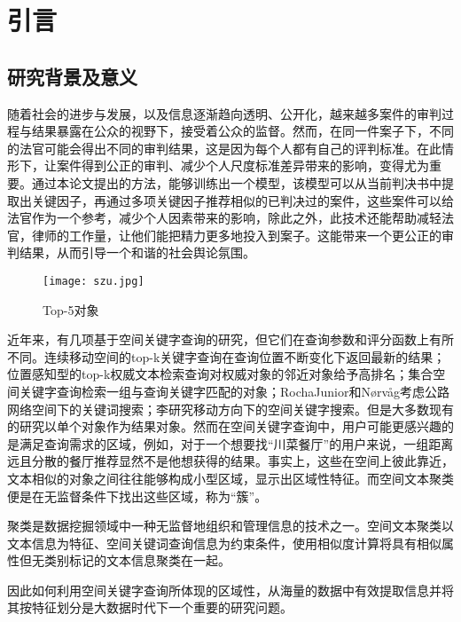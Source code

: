 \section{引言}

\subsection{研究背景及意义}
随着社会的进步与发展，以及信息逐渐趋向透明、公开化，越来越多案件的审判过程与结果暴露在公众的视野下，接受着公众的监督。然而，在同一件案子下，不同的法官可能会得出不同的审判结果，这是因为每个人都有自己的评判标准。在此情形下，让案件得到公正的审判、减少个人尺度标准差异带来的影响，变得尤为重要。通过本论文提出的方法，能够训练出一个模型，该模型可以从当前判决书中提取出关键因子，再通过多项关键因子推荐相似的已判决过的案件，这些案件可以给法官作为一个参考，减少个人因素带来的影响，除此之外，此技术还能帮助减轻法官，律师的工作量，让他们能把精力更多地投入到案子。这能带来一个更公正的审判结果，从而引导一个和谐的社会舆论氛围。\cite{WEB:judgement}

\begin{figure}[htbp]
	\begin{center}
		\texttt{[image: szu.jpg]}
		\caption{Top-5对象}
		\label{top5object}
	\end{center}
\end{figure}

近年来，有几项基于空间关键字查询的研究，但它们在查询参数和评分函数上有所不同。连续移动空间的top-k关键字查询在查询位置不断变化下返回最新的结果；位置感知型的top-k权威文本检索查询对权威对象的邻近对象给予高排名；集合空间关键字查询检索一组与查询关键字匹配的对象；RochaJunior和Nørvåg考虑公路网络空间下的关键词搜索；李研究移动方向下的空间关键字搜索。但是大多数现有的研究以单个对象作为结果对象。然而在空间关键字查询中，用户可能更感兴趣的是满足查询需求的区域，例如，对于一个想要找“川菜餐厅”的用户来说，一组距离远且分散的餐厅推荐显然不是他想获得的结果。事实上，这些在空间上彼此靠近，文本相似的对象之间往往能够构成小型区域，显示出区域性特征。而空间文本聚类便是在无监督条件下找出这些区域，称为“簇”。

聚类是数据挖掘领域中一种无监督地组织和管理信息的技术之一。空间文本聚类以文本信息为特征、空间关键词查询信息为约束条件，使用相似度计算将具有相似属性但无类别标记的文本信息聚类在一起。

因此如何利用空间关键字查询所体现的区域性，从海量的数据中有效提取信息并将其按特征划分是大数据时代下一个重要的研究问题。

